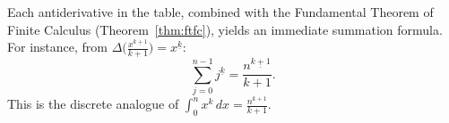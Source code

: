 \begin{remark*}
Each antiderivative in the table, combined with the Fundamental Theorem
of Finite Calculus (Theorem~\ref{thm:ftfc}), yields an immediate
summation formula. For instance, from \(\Delta\bigl(\tfrac{x^{\underline{k+1}}}{k+1}\bigr) = x^{\underline{k}}\):
\[
\sum_{j=0}^{n-1} j^{\underline{k}}
= \frac{n^{\underline{k+1}}}{k+1}.
\]
This is the discrete analogue of \(\int_0^n x^k\,dx = \tfrac{n^{k+1}}{k+1}\).
\end{remark*}
